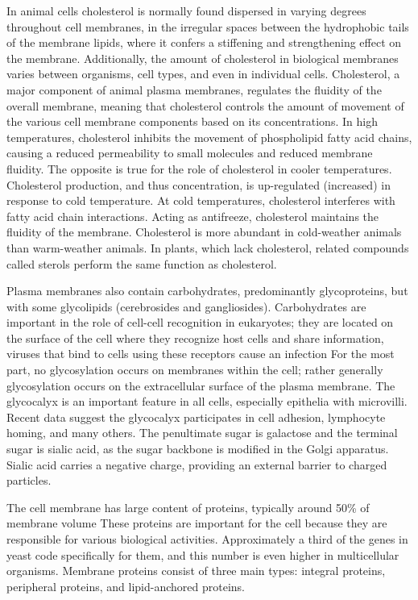 In animal cells cholesterol is normally found dispersed in varying degrees throughout cell membranes, in the irregular spaces between the hydrophobic tails of the membrane lipids, where it confers a stiffening and strengthening effect on the membrane. Additionally, the amount of cholesterol in biological membranes varies between organisms, cell types, and even in individual cells. Cholesterol, a major component of animal plasma membranes, regulates the fluidity of the overall membrane, meaning that cholesterol controls the amount of movement of the various cell membrane components based on its concentrations. In high temperatures, cholesterol inhibits the movement of phospholipid fatty acid chains, causing a reduced permeability to small molecules and reduced membrane fluidity. The opposite is true for the role of cholesterol in cooler temperatures. Cholesterol production, and thus concentration, is up-regulated (increased) in response to cold temperature. At cold temperatures, cholesterol interferes with fatty acid chain interactions. Acting as antifreeze, cholesterol maintains the fluidity of the membrane. Cholesterol is more abundant in cold-weather animals than warm-weather animals. In plants, which lack cholesterol, related compounds called sterols perform the same function as cholesterol.

Plasma membranes also contain carbohydrates, predominantly glycoproteins, but with some glycolipids (cerebrosides and gangliosides). Carbohydrates are important in the role of cell-cell recognition in eukaryotes; they are located on the surface of the cell where they recognize host cells and share information, viruses that bind to cells using these receptors cause an infection For the most part, no glycosylation occurs on membranes within the cell; rather generally glycosylation occurs on the extracellular surface of the plasma membrane. The glycocalyx is an important feature in all cells, especially epithelia with microvilli. Recent data suggest the glycocalyx participates in cell adhesion, lymphocyte homing, and many others. The penultimate sugar is galactose and the terminal sugar is sialic acid, as the sugar backbone is modified in the Golgi apparatus. Sialic acid carries a negative charge, providing an external barrier to charged particles.

The cell membrane has large content of proteins, typically around 50\% of membrane volume These proteins are important for the cell because they are responsible for various biological activities. Approximately a third of the genes in yeast code specifically for them, and this number is even higher in multicellular organisms. Membrane proteins consist of three main types: integral proteins, peripheral proteins, and lipid-anchored proteins.

